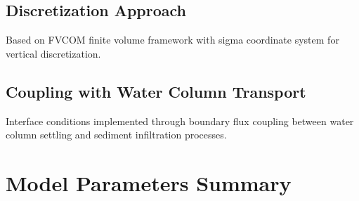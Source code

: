 \documentclass[11pt,a4paper]{article}
\begin{document}
\subsection{Discretization Approach}
Based on FVCOM finite volume framework with sigma coordinate system for vertical discretization.

\subsection{Coupling with Water Column Transport}
Interface conditions implemented through boundary flux coupling between water column settling and sediment infiltration processes.

\section{Model Parameters Summary}
\end{document}
